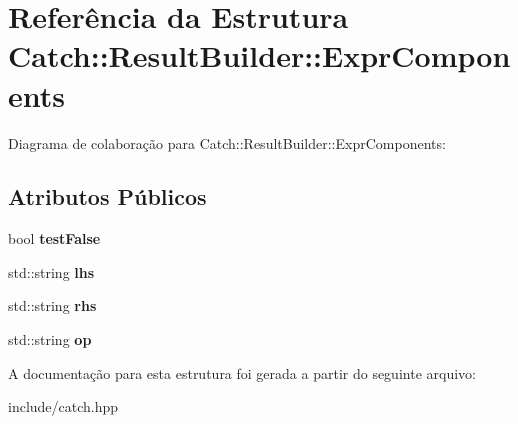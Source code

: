 \hypertarget{structCatch_1_1ResultBuilder_1_1ExprComponents}{}\section{Referência da Estrutura Catch\+:\+:Result\+Builder\+:\+:Expr\+Components}
\label{structCatch_1_1ResultBuilder_1_1ExprComponents}


Diagrama de colaboração para Catch\+:\+:Result\+Builder\+:\+:Expr\+Components\+:
\subsection*{Atributos Públicos}
\begin{DoxyCompactItemize}
\item 
bool {\bfseries test\+False}\hypertarget{structCatch_1_1ResultBuilder_1_1ExprComponents_a34f5107aaf0444b7b08c4de4dff0600b}{}\label{structCatch_1_1ResultBuilder_1_1ExprComponents_a34f5107aaf0444b7b08c4de4dff0600b}

\item 
std\+::string {\bfseries lhs}\hypertarget{structCatch_1_1ResultBuilder_1_1ExprComponents_a3f30e5dc3d6bbc977e9f20366fd9c856}{}\label{structCatch_1_1ResultBuilder_1_1ExprComponents_a3f30e5dc3d6bbc977e9f20366fd9c856}

\item 
std\+::string {\bfseries rhs}\hypertarget{structCatch_1_1ResultBuilder_1_1ExprComponents_a62e7ea75710403ef529f4b3a55427659}{}\label{structCatch_1_1ResultBuilder_1_1ExprComponents_a62e7ea75710403ef529f4b3a55427659}

\item 
std\+::string {\bfseries op}\hypertarget{structCatch_1_1ResultBuilder_1_1ExprComponents_a3b96b65f90d8fedb042b9070f2832273}{}\label{structCatch_1_1ResultBuilder_1_1ExprComponents_a3b96b65f90d8fedb042b9070f2832273}

\end{DoxyCompactItemize}


A documentação para esta estrutura foi gerada a partir do seguinte arquivo\+:\begin{DoxyCompactItemize}
\item 
include/catch.\+hpp\end{DoxyCompactItemize}
